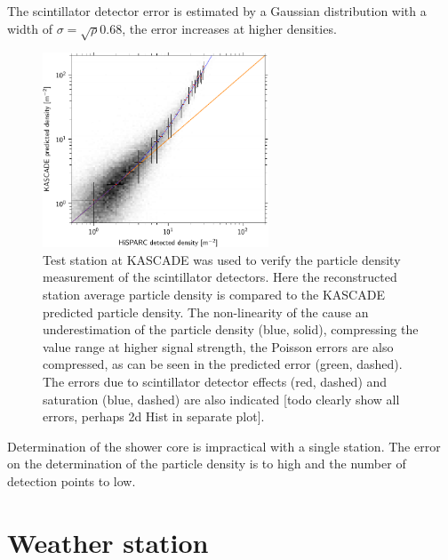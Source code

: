 The scintillator detector error is estimated by a Gaussian distribution with a width of $\sigma = \sqrt{\rho} 0.68$, the error increases at higher densities.

\begin{figure}
    \centering
    \includegraphics[width=0.6\textwidth]
                    {plots/station/hisparc_kascade_station_mpv}
    \caption{Test station at KASCADE was used to verify the particle density measurement of the scintillator detectors. Here the reconstructed station average particle density is compared to the KASCADE predicted particle density. The non-linearity of the \pmts cause an underestimation of the \hisparc particle density (blue, solid), compressing the value range at higher signal strength, the Poisson errors are also compressed, as can be seen in the predicted error (green, dashed). The errors due to scintillator detector effects (red, dashed) and \pmt saturation (blue, dashed) are also indicated [todo clearly show all errors, perhaps 2d Hist in separate plot].}
    \label{fig:hisparc_kascade_station_mpv}
\end{figure}

Determination of the shower core is impractical with a single station. The error on the determination of the particle density is to high and the number of detection points to low.


\section{Weather station}

